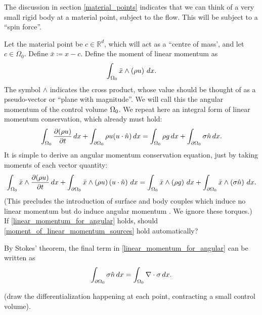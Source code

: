 The discussion in section \ref{material_points} indicates that we can think of a very small rigid body at a material point, subject to the flow.
This will be subject to a ``spin force''.

Let the material point be $c \in \mathbb{R}^d$, which will act as a ``centre of mass', and let $c \in \Omega_0$.
Define $\bar{x} \coloneqq x - c$.
Define the moment of linear momentum as
\begin{equation}\label{moment_of_linear_momentum}
    \int_{{\Omega_0}} \bar{x} \wedge \left(\rho u\right)\,dx.
\end{equation}
The symbol $\wedge$ indicates the cross product, whose value should be thought of as a pseudo-vector or ``plane with magnitude''.
We will call this the angular momentum of the control volume ${\Omega_0}$.
We repeat here an integral form of linear momentum conservation, which already must hold:
\begin{equation}\label{linear_momentum_for_angular}
    \int_{{\Omega_0}} \frac{\partial (\rho u)}{\partial t}\,dx + \int_{{\partial\Omega_0}} \rho u (u\cdot \hat{n})\,dx
    = \int_{{\Omega_0}} \rho g\,dx + \int_{{\partial\Omega_0}} \sigma \hat{n}\,dx.
\end{equation}
It is simple to derive an angular momentum conservation equation, just by taking moments of each vector quantity:
\begin{equation}\label{moment_of_linear_momentum_sources}
    \int_{{\Omega_0}} \bar{x} \wedge \frac{\partial (\rho u)}{\partial t}\,dx + \int_{{\partial\Omega_0}} \bar{x} \wedge \left(\rho u\right)\left(u\cdot \hat{n}\right)\,dx
    = \int_{{\Omega_0}} \bar{x} \wedge \left(\rho g\right)\,dx + \int_{{\partial\Omega_0}} \bar{x} \wedge \left(\sigma \hat{n}\right)\,dx.
\end{equation}
(This precludes the introduction of surface and body couples which induce no linear momentum but do induce angular momentum
\cite{leal}. We ignore these torques.)
\\
If \eqref{linear_momentum_for_angular} holds, should \eqref{moment_of_linear_momentum_sources} hold automatically?
% 

By Stokes' theorem, the final term in \eqref{linear_momentum_for_angular} can be written as
\begin{align*}
    \int_{{\partial\Omega_0}} \sigma\hat{n}\,dx = \int_{\Omega_0}\nabla\cdot\sigma\,dx.
\end{align*}

\vskip 0.2in
(draw the differentialization happening at each point, contracting a small control volume).
\vskip 0.2in

